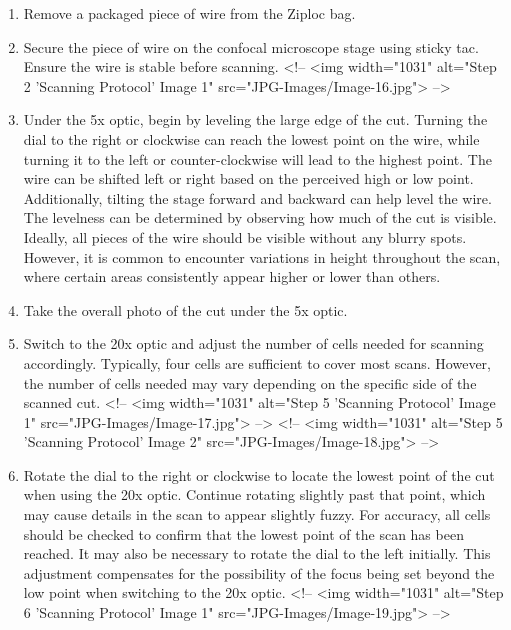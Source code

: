 \documentclass[fleqn,10pt]{wlscirep}
\begin{document}
\begin{enumerate}
  \item
  Remove a packaged piece of wire from the Ziploc bag.

  \item
  Secure the piece of wire on the confocal microscope stage using sticky tac. Ensure the wire is stable before scanning.
<!-- <img width="1031" alt="Step 2 'Scanning Protocol' Image 1" src="JPG-Images/Image-16.jpg"> -->

  \item
  Under the 5x optic, begin by leveling the large edge of the cut. Turning the dial to the right or clockwise can reach the lowest point on the wire, while turning it to the left or counter-clockwise will lead to the highest point. The wire can be shifted left or right based on the perceived high or low point. Additionally, tilting the stage forward and backward can help level the wire. The levelness can be determined by observing how much of the cut is visible. Ideally, all pieces of the wire should be visible without any blurry spots. However, it is common to encounter variations in height throughout the scan, where certain areas consistently appear higher or lower than others.

  \item
  Take the overall photo of the cut under the 5x optic.

  \item
  Switch to the 20x optic and adjust the number of cells needed for scanning accordingly. Typically, four cells are sufficient to cover most scans. However, the number of cells needed may vary depending on the specific side of the scanned cut.
<!-- <img width="1031" alt="Step 5 'Scanning Protocol' Image 1" src="JPG-Images/Image-17.jpg"> -->
<!-- <img width="1031" alt="Step 5 'Scanning Protocol' Image 2" src="JPG-Images/Image-18.jpg"> -->

  \item
  Rotate the dial to the right or clockwise to locate the lowest point of the cut when using the 20x optic. Continue rotating slightly past that point, which may cause details in the scan to appear slightly fuzzy. For accuracy, all cells should be checked to confirm that the lowest point of the scan has been reached. It may also be necessary to rotate the dial to the left initially. This adjustment compensates for the possibility of the focus being set beyond the low point when switching to the 20x optic.
<!-- <img width="1031" alt="Step 6 'Scanning Protocol' Image 1" src="JPG-Images/Image-19.jpg"> -->


\end{enumerate}
\end{document}
